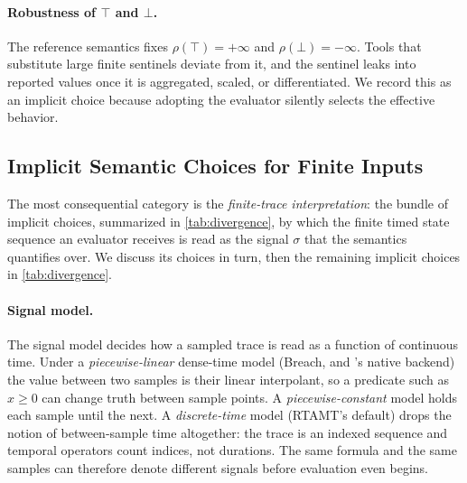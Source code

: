 \paragraph{Robustness of $\top$ and $\bot$.}
The reference semantics fixes $\rho(\top) = +\infty$ and $\rho(\bot) = -\infty$.
Tools that substitute large finite sentinels deviate from it, and the sentinel
leaks into reported values once it is aggregated, scaled, or differentiated. We
record this as an implicit choice because adopting the evaluator silently
selects the effective behavior.

\subsection{Implicit Semantic Choices for Finite Inputs}
\label{sec:app-open}

The most consequential category is the \emph{finite-trace interpretation}: the bundle of
implicit choices, summarized in \cref{tab:divergence},
by which the finite timed state sequence an evaluator receives is read as
the signal $\sigma$ that the semantics quantifies over. We discuss its
choices in turn, then the remaining implicit choices in
\cref{tab:divergence}.

\paragraph{Signal model.}
The signal model decides how a sampled trace is read as a function of
continuous time. Under a \emph{piecewise-linear} dense-time model (Breach, and
\tool's native backend) the value between two samples is their linear
interpolant, so a predicate such as $x \geq 0$ can change truth between sample
points. A \emph{piecewise-constant} model holds each sample until the next. A
\emph{discrete-time} model (RTAMT's default) drops the notion of between-sample
time altogether: the trace is an indexed sequence and temporal operators count
indices, not durations. The same formula and the same samples can therefore
denote different signals before evaluation even begins.

